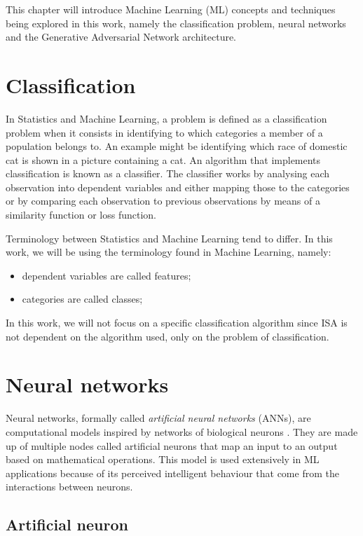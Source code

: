 
This chapter will introduce Machine Learning (ML) concepts and techniques being explored in this work, namely the classification problem, neural networks and the Generative Adversarial Network architecture.

\section{Classification}

In Statistics and Machine Learning, a problem is defined as a classification problem when it consists in identifying to which categories a member of a population belongs to. An example might be identifying which race of domestic cat is shown in a picture containing a cat. An algorithm that implements classification is known as a classifier. The classifier works by analysing each observation into dependent variables and either mapping those to the categories or by comparing each observation to previous observations by means of a similarity function or loss function. 

Terminology between Statistics and Machine Learning tend to differ. In this work, we will be using the terminology found in Machine Learning, namely:

\begin{itemize}
	\item dependent variables are called features;
	\item categories are called classes;
\end{itemize}

In this work, we will not focus on a specific classification algorithm since ISA is not dependent on the algorithm used, only on the problem of classification.

\section{Neural networks}

Neural networks, formally called \emph{artificial neural networks} (ANNs), are computational models inspired by networks of biological neurons \cite{Puri2016}. They are made up of multiple nodes called artificial neurons that map an input to an output based on mathematical operations. This model is used extensively in ML applications because of its perceived intelligent behaviour that come from the interactions between neurons.

\subsection{Artificial neuron}


